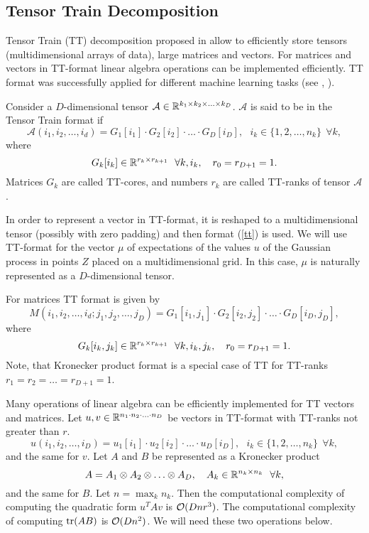 \subsection{Tensor Train Decomposition}
\label{tensor_train}

  Tensor Train (TT) decomposition proposed in \citet{oseledets2011} allow to
  efficiently store tensors (multidimensional arrays of data), large matrices and
  vectors. For matrices and vectors in TT-format linear algebra operations
  can be implemented efficiently. TT format was successfully applied for
  different machine learning tasks (see \citet{novikov2014}, \citet{novikov2015}).

  Consider a $D$-dimensional tensor $\mathcal A \in \mathbb{R}^{k_1 \times k_2 \times \ldots \times k_D}$.
  $\mathcal{A}$ is said to be in the Tensor Train format if
  \begin{equation}
  \label{tt}
    \mathcal{A}(i_1, i_2, \ldots, i_d) = G_1[i_1] \cdot G_2[i_2] \cdot \ldots \cdot G_D[i_D],~~~
    i_k \in \{1, 2, \ldots, n_k\}~~\forall k,
  \end{equation}
  where
  \[
    G_k[i_k] \in \mathbb{R}^{r_k\times r_{k+1}}~~\forall k, i_k,~~~r_0 = r_{D+1} = 1.
  \]
  Matrices $G_k$ are called TT-cores, and numbers $r_k$ are called TT-ranks of
  tensor $\mathcal{A}$.

  In order to represent a vector in TT-format, it is reshaped to a multidimensional
  tensor (possibly with zero padding) and then format (\ref{tt}) is used. We will
  use TT-format for the vector $\mu$ of expectations of the values $u$ of the
  Gaussian process in points $Z$ placed on a multidimensional grid. In this case,
  $\mu$ is naturally represented as a $D$-dimensional tensor.

  For matrices TT format is given by
  \[
    M(i_1, i_2, \ldots, i_d; j_1, j_2, \ldots, j_D) = G_1 [i_1, j_1] \cdot 
    G_2[i_2, j_2] \cdot \ldots \cdot G_D[i_D, j_D],
  \]
  where
  \[
    G_k[i_k, j_k] \in \mathbb{R}^{r_k\times r_{k+1}}~~\forall k, i_k, j_k,~~~r_0 = r_{D+1} = 1.
  \]
  Note, that Kronecker product format is a special case of TT for TT-ranks
  $r_1 = r_2 = \ldots = r_{D+1} = 1$.

  Many operations of linear algebra can be efficiently implemented for TT vectors
  and matrices. Let $u, v \in \mathbb{R}^{n_1 \cdot n_2 \cdot \ldots \cdot n_D}$ be vectors
  in TT-format with TT-ranks not greater than $r$. 
  \[
    u(i_1, i_2, \ldots, i_D) = u_1[i_1] \cdot u_2[i_2] \cdot \ldots \cdot u_D[i_D],~~~
    i_k \in \{1, 2, \ldots, n_k\}~~\forall k,
  \]
  and the same for $v$.
  Let $A$ and $B$ be represented as a Kronecker product
  \[
    A = A_1 \otimes A_2 \otimes \ldots \otimes A_D,~~~A_k \in \mathbb{R}^{n_k \times n_k}~~\forall k,
  \]
  and the same for $B$. Let $n = \max_k n_k$. Then the computational complexity
  of computing the quadratic form $u^T A v$ is $\mathcal{O}(Dnr^3)$. The computational
  complexity of computing $\mbox{tr}(AB)$ is $\mathcal{O}(Dn^2)$. We will need these two
  operations below.

